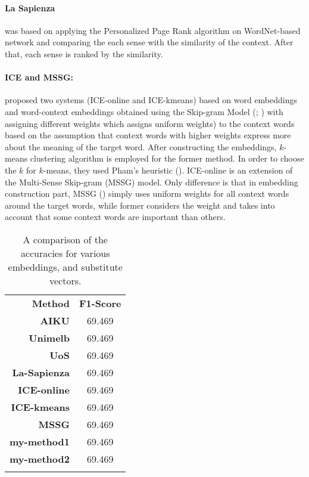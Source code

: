 \paragraph{La Sapienza} was based on applying the Personalized Page Rank algorithm \cite{agirre09personalizing} on WordNet-based network and comparing the each sense with the similarity of the context. After that, each sense is ranked by the similarity.  

\paragraph{ICE and MSSG:} \cite{kageback15neuralembedding} proposed two systems (ICE-online and ICE-kmeans) based on word embeddings and word-context embeddings obtained using the Skip-gram Model (\cite{mikolov2013efficient}; \cite{levy2014dependencybased}) with assigning different weights which assigns uniform weights) to the context words based on the assumption that context words with higher weights express more about the meaning of the target word. After constructing the embeddings, $k$-means clustering algorithm is employed for the former method. In order to choose the $k$ for $k$-means, they used Pham's heuristic (\cite{pham2005selection}). ICE-online is an extension of the Multi-Sense Skip-gram (MSSG) model. Only difference is that in embedding construction part, MSSG (\cite{neelakantan2015efficient}) simply uses uniform weights for all context words around the target words, while former considers the weight and takes into account that some context words are important than others.


\begin{table}
\begin{center}
    \begin{tabular}{  r | c } \Xhline{2\arrayrulewidth}
    \bf Method & \bf F1-Score \\ \Xhline{2\arrayrulewidth} 
    \bf AIKU & 69.469 \\ 
    \bf Unimelb & 69.469 \\ 
    \bf UoS & 69.469 \\ 
    \bf La-Sapienza & 69.469 \\ \hline
    \bf ICE-online & 69.469 \\ 
    \bf ICE-kmeans & 69.469 \\ 
    \bf MSSG & 69.469 \\ \hline
    \bf my-method1 & 69.469 \\ 
    \bf my-method2 & 69.469 \\ \Xhline{2\arrayrulewidth}

    \end{tabular}
\end{center}
    \caption{\label{table:semeval13-system-scores} A comparison of the accuracies for various embeddings, and substitute vectors.}
\end{table}